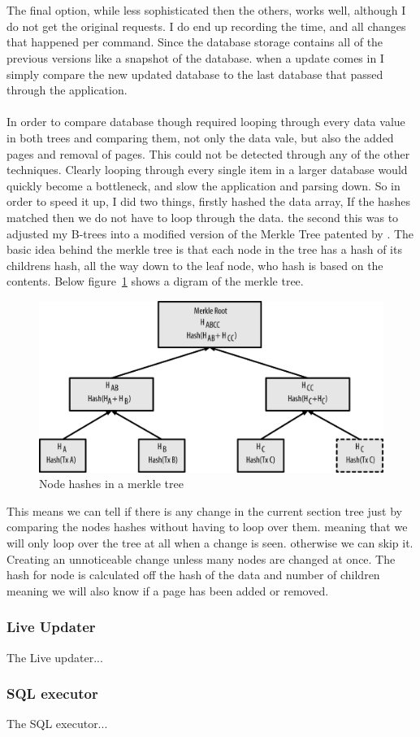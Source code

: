 \\\\
The final option, while less sophisticated then the others, works well, although I do not get the original requests. I do end up recording the time, and all changes that happened per command. Since the database storage contains all of the previous versions like a snapshot of the database. when a update comes in I simply compare the new updated database to the last database that passed through the application.
\\\\
In order to compare database though required looping through every data value in both trees and comparing them, not only the data vale, but also the added pages and removal of pages. This could not be detected through any of the other techniques. Clearly looping through every single item in a larger database would quickly become a bottleneck, and slow the application and parsing down. So in order to speed it up, I did two things, firstly hashed the data array, If the hashes matched then we do not have to loop through the data. the second this was to adjusted my B-trees into a modified version of the Merkle Tree patented by \cite{merkletree}. The basic idea behind the merkle tree is that each node in the tree has a hash of its childrens hash, all the way down to the leaf node, who hash is based on the contents. Below figure~\ref{fig:merkle_tree} shows a digram of the merkle tree.

\begin{figure}[H]
	\centering
	\includegraphics[scale=1.0]{images/merkle_tree.png}
	\caption{Node hashes in a  merkle tree \citep{bitcoin}}
	\label{fig:merkle_tree}
\end{figure}

This means we can tell if there is any change in the current section tree just by comparing the nodes hashes without having to loop over them. meaning that we will only loop over the tree at all when a change is seen. otherwise we can skip it. Creating an unnoticeable change unless many nodes are changed at once. The hash for node is calculated off the hash of the data and number of children meaning we will also know if a page has been added or removed. 

\subsubsection{Live Updater}
\label{subsubsec:live_Updater_imp}

The Live updater...

\subsubsection{SQL executor}
\label{subsubsec:sql_executor_imp}

The SQL executor...